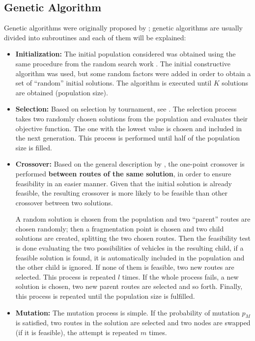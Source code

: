 \documentclass[10pt,twoside]{article}
\begin{document}
\subsection{Genetic Algorithm}
Genetic algorithms were originally proposed by \cite{holland1975adaptation}; genetic algorithms are usually divided into subroutines and each of them will be explained:
\begin{itemize}
 \item \textbf{Initialization:} The initial population considered was obtained using the same procedure from the random search work \citep{random}. The initial constructive algorithm \citep{constr} was used, but some random factors were added in order to obtain a set of ``random'' initial solutions. The algorithm is executed until $K$ solutions are obtained (population size).
 \item \textbf{Selection:} Based on selection by tournament, see \citep[p. 181]{baeck2018evolutionary}. The selection process takes two randomly chosen solutions from the population and evaluates their objective function. The one with the lowest value is chosen and included in the next generation. This process is performed until half of the population size is filled.
 \item \textbf{Crossover:} Based on the general description by \cite{umbarkar2015crossover}, the one-point crossover is performed \textbf{between routes of the same solution}, in order to ensure feasibility in an easier manner. Given that the initial solution is already feasible, the resulting crossover is more likely to be feasible than other crossover between two solutions. 
 
 A random solution is chosen from the population and two ``parent'' routes are chosen randomly; then a fragmentation point is chosen and two child solutions are created, splitting the two chosen routes. Then the feasibility test is done evaluating the two possibilities of vehicles in the resulting child, if a feasible solution is found, it is automatically included in the population and the other child is ignored. If none of them is feasible, two new routes are selected. This process is repeated $l$ times. If the whole process fails, a new solution is chosen, two new parent routes are selected and so forth. Finally, this process is repeated until the population size is fulfilled.
 \item \textbf{Mutation:} The mutation process is simple. If the probability of mutation $p_M$ is satisfied, two routes in the solution are selected and two nodes are swapped (if it is feasible), the attempt is repeated $m$ times.\end{itemize}
 
\end{document}
